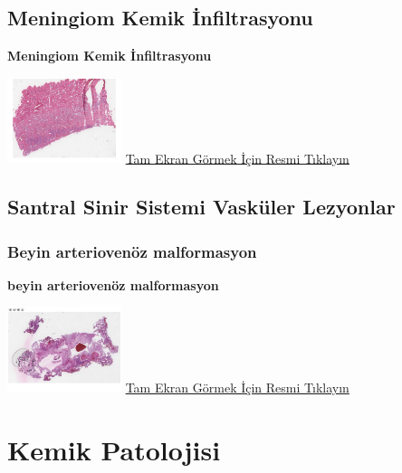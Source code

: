 \documentclass[
  letterpaper,
  DIV=11,
  numbers=noendperiod]{scrreprt}
\begin{document}
\hypertarget{sec-kemik-infiltrasyonu-gosteren-meningiom}{%
\chapter{Meningiom Kemik
İnfiltrasyonu}\label{sec-kemik-infiltrasyonu-gosteren-meningiom}}

\textbf{Meningiom Kemik İnfiltrasyonu}

\href{https://images.patolojiatlasi.com/meningioma-bone-infiltration/HE.html}{\includegraphics[width=0.25\textwidth,height=\textheight]{./screenshots/thumbnail_meningioma-bone-infiltration.png}}
\href{https://images.patolojiatlasi.com/meningioma-bone-infiltration/HE.html}{Tam
Ekran Görmek İçin Resmi Tıklayın}

\hypertarget{sec-santral-sinir-sistemi-vaskuler}{%
\chapter{Santral Sinir Sistemi Vasküler
Lezyonlar}\label{sec-santral-sinir-sistemi-vaskuler}}

\hypertarget{sec-beyin-arteriovenoz-malformasyon}{%
\section{Beyin arteriovenöz
malformasyon}\label{sec-beyin-arteriovenoz-malformasyon}}

\textbf{beyin arteriovenöz malformasyon}

\href{https://images.patolojiatlasi.com/brain-arteriovenous-malformation/HE.html}{\includegraphics[width=0.25\textwidth,height=\textheight]{./screenshots/thumbnail_brain-arteriovenous-malformation.png}}
\href{https://images.patolojiatlasi.com/brain-arteriovenous-malformation/HE.html}{Tam
Ekran Görmek İçin Resmi Tıklayın}

\part{Kemik Patolojisi}
\end{document}
